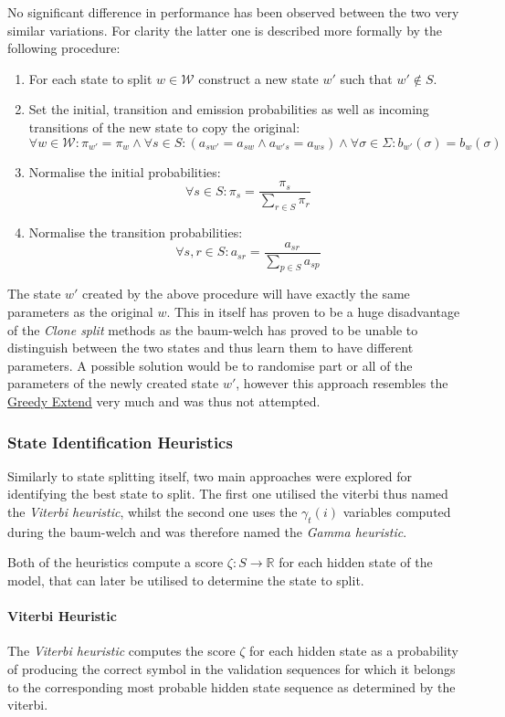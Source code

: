 No significant difference in performance has been observed between the two very similar variations. For clarity the latter one is described more formally by the following procedure:
\begin{enumerate}
	\item For each state to split $w \in\mathcal{W}$ construct a new state $w'$ such that $w'\notin S$.
	\item Set the initial, transition and emission probabilities as well as incoming transitions of the new state to copy the original:
	$$\forall w\in\mathcal{W}: \pi_{w'} = \pi_w \wedge \forall s\in S: (a_{sw'} = a_{sw} \wedge a_{w's} = a_{ws}) \wedge \forall \sigma\in\Sigma: b_{w'}(\sigma)=b_w(\sigma)$$
	\item Normalise the initial probabilities:
	$$\forall s\in S: \pi_s = \frac{\pi_s}{\sum_{r\in S}\pi_r}$$
	\item Normalise the transition probabilities:
	$$\forall s,r\in S: a_{sr} = \frac{a_{sr}}{\sum_{p\in S}a_{sp}}$$
\end{enumerate}

The state $w'$ created by the above procedure will have exactly the same parameters as the original $w$. This in itself has proven to be a huge disadvantage of the \emph{Clone split} methods as the \gls{baum-welch} has proved to be unable to distinguish between the two states and thus learn them to have different parameters. A possible solution would be to randomise part or all of the parameters of the newly created state $w'$, however this approach resembles the \hyperref[sec:greedy_extend]{Greedy Extend} very much and was thus not attempted.



\subsubsection{State Identification Heuristics}
Similarly to state splitting itself, two main approaches were explored for identifying the best state to split. The first one utilised the \gls{viterbi} thus named the \emph{Viterbi heuristic}, whilst the second one uses the $\gamma_t(i)$ variables computed during the \gls{baum-welch} and was therefore named the \emph{Gamma heuristic}.

Both of the heuristics compute a score $\zeta:S \rightarrow \mathbb{R}$ for each hidden state of the model, that can later be utilised to determine the state to split.

\paragraph{Viterbi Heuristic}
The \emph{Viterbi heuristic} computes the score $\zeta$ for each hidden state as a probability of producing the correct symbol in the validation sequences for which it belongs to the corresponding most probable hidden state sequence as determined by the \gls{viterbi}.

